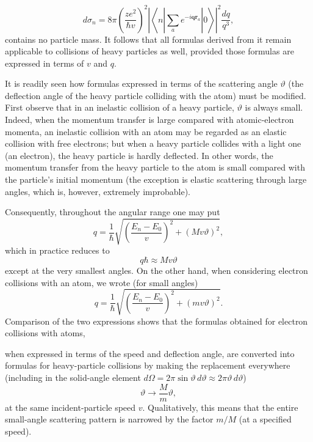 

\begin{equation}
 d\sigma_n=8\pi\left(\frac{ze^2}{\hbar v}\right)^2
 \left|\left\langle n\left|\sum_a e^{-i\mathbf q\mathbf r_a}\right|0\right\rangle\right|^2
 \frac{dq}{q^3},
 \tag{150.3}
\end{equation}
contains no particle mass. It follows that all formulas derived from it remain
applicable to collisions of heavy particles as well, provided those formulas
are expressed in terms of $v$ and $q$.

It is readily seen how formulas expressed in terms of the scattering angle
$\vartheta$ (the deflection angle of the heavy particle colliding with the
atom) must be modified. First observe that in an inelastic collision of a
heavy particle, $\vartheta$ is always small. Indeed, when the momentum
transfer is large compared with atomic-electron momenta, an inelastic
collision with an atom may be regarded as an elastic collision with free
electrons; but when a heavy particle collides with a light one (an electron),
the heavy particle is hardly deflected. In other words, the momentum transfer
from the heavy particle to the atom is small compared with the particle's
initial momentum (the exception is elastic scattering through large angles,
which is, however, extremely improbable).

Consequently, throughout the angular range one may put
\begin{equation}
 q=\frac1\hbar\sqrt{\left(\frac{E_n-E_0}{v}\right)^2+(Mv\vartheta)^2},
 \tag{150.4}
\end{equation}
which in practice reduces to
\begin{equation}
 q\hbar\approx Mv\vartheta
 \tag{150.5}
\end{equation}
except at the very smallest angles. On the other hand, when considering
electron collisions with an atom, we wrote (for small angles)
\[
 q=\frac1\hbar\sqrt{\left(\frac{E_n-E_0}{v}\right)^2+(mv\vartheta)^2}.
\]
Comparison of the two expressions shows that the formulas obtained for
electron collisions with atoms,

when expressed in terms of the speed and deflection angle, are converted into
formulas for heavy-particle collisions by making the replacement everywhere
(including in the solid-angle element
$d\Omega=2\pi\sin\vartheta\,d\vartheta\approx
2\pi\vartheta\,d\vartheta$)
\begin{equation}
 \vartheta\longrightarrow\frac{M}{m}\vartheta,
 \tag{150.6}
\end{equation}
at the same incident-particle speed $v$. Qualitatively, this means that the
entire small-angle scattering pattern is narrowed by the factor $m/M$ (at a
specified speed).

